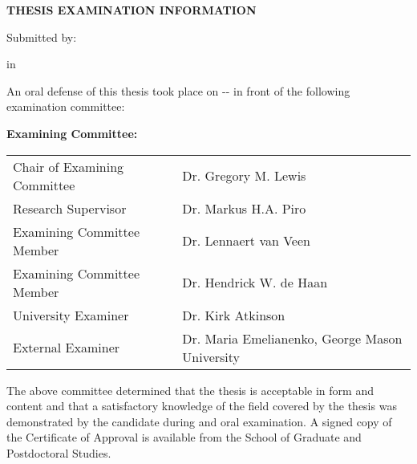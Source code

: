 
\cleardoublepage
\thispagestyle{plain}

\begin{center}
\textbf{THESIS EXAMINATION INFORMATION}

\bigskip

Submitted by:  \makeatletter\textbf{\@firstname\ {\@lastname}}\makeatother

\bigskip
\bigskip

\textbf{\degree} in \textbf{\program}

\end{center}


\bigskip
\bigskip

\noindent {}

\bigskip

An oral defense of this thesis took place on -\degreemonth-\degreeyear{} in front of the following examination committee:

\medskip

\noindent\textbf{Examining Committee:}

\medskip

\begingroup
\renewcommand{\arraystretch}{1.5}
\begin{tabular}{lcl}
    Chair of Examining Committee &\phantom{abc}& Dr. Gregory  M. Lewis\\
    Research Supervisor && Dr. Markus H.A. Piro\\
    Examining Committee Member && Dr. Lennaert van Veen \\
    Examining Committee Member && Dr. Hendrick W. de Haan \\
    University Examiner && Dr. Kirk Atkinson \\
    External Examiner && Dr. Maria Emelianenko, George Mason University\\
\end{tabular}
\endgroup

\medskip

\noindent The above committee determined that the thesis is acceptable in form and content and that a satisfactory knowledge of the field covered by the thesis was demonstrated by the candidate during and oral examination. A signed copy of the Certificate of Approval is available from the School of Graduate and Postdoctoral Studies.
